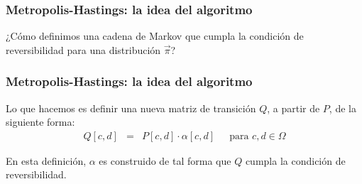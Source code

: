 \documentclass{beamer}
\newcommand{\vs}[1]{\vspace{#1mm}}
\begin{document}
	
	\begin{frame}
		\frametitle{Metropolis-Hastings: la idea del algoritmo}
		
		{\small
			
			¿Cómo definimos una cadena de Markov que cumpla la condición de reversibilidad para una distribución $\vec \pi$?
			
			\vs{8}
			
			
			\vs{8}
			
			
		}
		
	\end{frame}
	
	
	
	
	
	\begin{frame}
		\frametitle{Metropolis-Hastings: la idea del algoritmo}
		
		{\small
			
			Lo que hacemos es definir una nueva matriz de transición $Q$, a partir de $P$, de la siguiente forma:
			\begin{eqnarray*}
				Q[c,d] & = & P[c,d] \cdot \alpha[c,d] \ \ \ \ \ \text{ para } c,d \in \Omega
			\end{eqnarray*}
			
			\vs{8}
			
			En esta definición, $\alpha$ es construido de tal forma que $Q$ cumpla la condición de reversibilidad. 
			
		}
		
	\end{frame}
	
	
	
	
	
\end{document}
